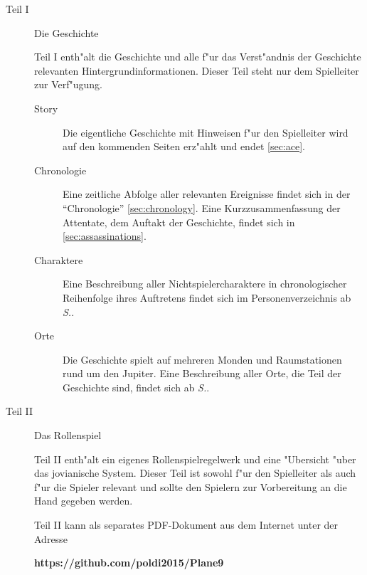 \newcommand{\sfromref}[1]{ab \textit{S.\pageref{#1}}}
\begin{description}
    \item [Teil I] Die Geschichte

        Teil I enth"alt die Geschichte und alle f"ur das Verst"andnis der Geschichte relevanten Hintergrundinformationen. Dieser Teil steht nur dem Spielleiter zur Verf"ugung.
        \begin{description}
            \item [Story] Die eigentliche Geschichte mit Hinweisen f"ur den Spielleiter wird auf den kommenden Seiten erz"ahlt und endet \cref{sec:ace}.
            \item [Chronologie] Eine zeitliche Abfolge aller relevanten Ereignisse findet sich in der ``Chronologie'' 
                \cref{sec:chronology}. Eine Kurzzusammenfassung der Attentate, dem Auftakt der Geschichte, findet sich in \cref{sec:assassinations}.
            \item [Charaktere] Eine Beschreibung aller Nichtspielercharaktere in chronologischer Reihenfolge ihres Auftretens findet sich 
                im Personenverzeichnis  \sfromref{sec:nsc}.
            \item [Orte]  Die Geschichte spielt auf mehreren Monden und Raumstationen rund um den Jupiter. Eine Beschreibung aller Orte, 
                die Teil der Geschichte sind, findet sich \sfromref{sec:locations}.
        \end{description}
    \item [Teil II] Das Rollenspiel

        Teil II enth"alt ein eigenes Rollenspielregelwerk und eine "Ubersicht "uber das jovianische System. Dieser Teil ist sowohl f"ur den Spielleiter als auch f"ur die Spieler relevant und sollte den Spielern zur Vorbereitung an die Hand gegeben werden. 
    
        Teil II kann als separates PDF-Dokument aus dem Internet unter der Adresse 
        
        \textbf{https://github.com/poldi2015/Plane9}
        

\end{description}
